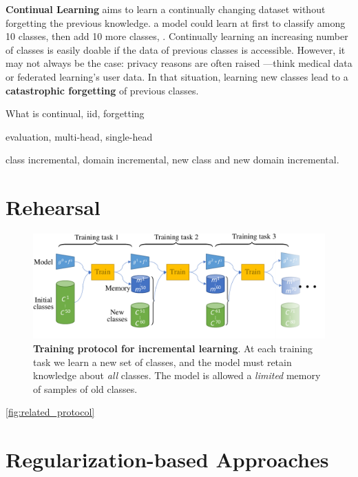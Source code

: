 \textbf{Continual Learning} aims to learn a continually changing dataset without forgetting the
previous knowledge. \eg a model could learn at first to classify among 10 classes, then add 10 more
classes, \etc. Continually learning an increasing number of classes is easily doable if the data of
previous classes is accessible. However, it may not always be the case: privacy reasons are often
raised ---think medical data or federated learning's user data. In that situation, learning new
classes lead to a \textbf{catastrophic forgetting} \citep{robins1995catastrophicforgetting} of
previous classes.

What is continual, iid, forgetting

evaluation, multi-head, single-head

class incremental, domain incremental, new class and new domain incremental. \cite{lomonaco2017core50}


\section{Rehearsal}

\begin{figure}[tb]
    \begin{center}
        \includegraphics[width=0.8\linewidth]{images/podnet/protocol}
    \end{center}
    \caption{\textbf{Training protocol for incremental learning}. At each training task we learn a
        new set of classes, and the model must retain knowledge about \textit{all} classes. The
        model is allowed a \textit{limited} memory of samples of old classes.}
    \label{fig:related_protocol}
\end{figure}

\autoref{fig:related_protocol}


\section{Regularization-based Approaches}

